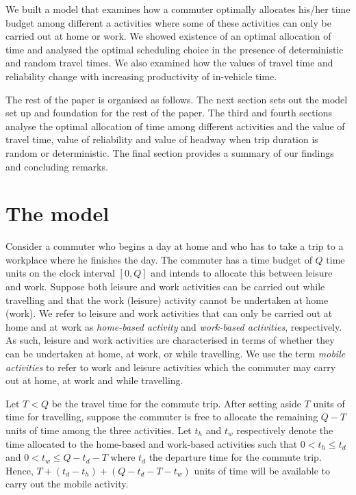 \documentclass[12pt,a4paper,british]{article}
\begin{document}
We built a model that examines how a commuter optimally allocates his/her time budget among different a activities where some of these activities can only be carried out at home or work. We showed existence of an optimal allocation of time and analysed the optimal scheduling choice in the presence of deterministic and random travel times. We also examined how the values of travel time and reliability change with increasing productivity of in-vehicle time.

The rest of the paper is organised as follows. The next section sets out the model set up and foundation for the rest of the paper. The third and fourth sections analyse the optimal allocation of time among different activities and the value of travel time, value of reliability and value of headway when trip duration is random or deterministic. The final section provides a summary of our findings and concluding remarks.

\section{The model}
\label{sec:model1}

Consider a commuter who begins a day at home and who has to take a trip to a workplace where he finishes the day. The commuter has a time budget of $Q$ time units on the clock interval $[0, Q]$ and intends to allocate this between leisure and work. Suppose both leisure and work activities can be carried out while travelling and that the work (leisure) activity cannot be undertaken at home (work). We refer to leisure and work activities that can only be carried out at home and at work as \emph{home-based activity} and \emph{work-based activities}, respectively. As such, leisure and work activities are characterised in terms of whether they can be undertaken at home, at work, or while travelling. We use the term \textit{mobile activities} to refer to work and leisure activities which the commuter may carry out at home, at work and while travelling.

Let $T<Q$ be the travel time for the commute trip. After setting aside $T$ units of time for travelling, suppose the commuter is free to allocate the remaining $Q-T$ units of time among the three activities. Let $t_{h}$ and $t_{w}$ respectively denote the time allocated to the home-based and work-based activities such that $0<t_{h}\leq t_{d}$ and $0<t_{w}\leq Q-t_{d}-T$ where $t_d$ the departure time for the commute trip. Hence,  $T+\left(t_{d}-t_{h}\right)+\left(Q-t_{d}-T-t_{w}\right)$ units of time will be available to carry out the mobile activity. 
\end{document}
